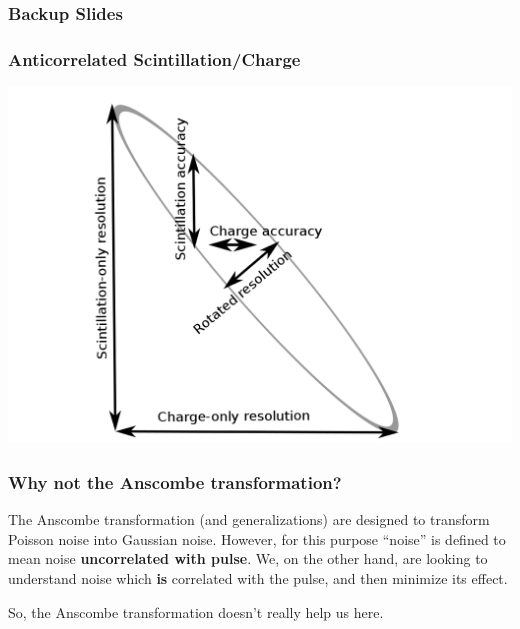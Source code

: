 \documentclass{beamer}
\begin{document}



\begin{frame}
\frametitle{Backup Slides}
\end{frame}

\begin{frame}
\begin{center}
\frametitle{Anticorrelated Scintillation/Charge}
\end{center}
\vspace{.5cm}
\begin{center}
\includegraphics[keepaspectratio=true,width=\textwidth]{RotatedIsland.png}
\end{center}
\end{frame}

\begin{frame}
\begin{center}
\frametitle{Why not the Anscombe transformation?}
\end{center}
The Anscombe transformation (and generalizations) are designed to transform Poisson noise into Gaussian noise.  However, for this purpose ``noise'' is defined to mean noise {\bf uncorrelated with pulse}.  We, on the other hand, are looking to understand noise which {\bf is} correlated with the pulse, and then minimize its effect.

So, the Anscombe transformation doesn't really help us here.
\end{frame}

\end{document}
